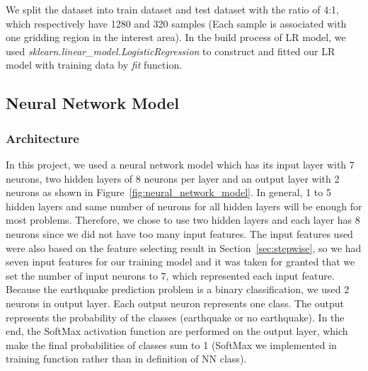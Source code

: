 \documentclass[final-report]{report-template}
\begin{document}
We split the dataset into train dataset and test dataset with the ratio of 4:1, which respectively have 1280 and 320 samples (Each sample is associated with one gridding region in the interest area). In the build process of LR model, we used \textit{sklearn.linear\_model.LogisticRegression} to construct and fitted our LR model with training data by \textit{fit} function.

\subsection{Neural Network Model}
\label{sec:NNM}
\subsubsection{Architecture}
In this project, we used a neural network model which has its input layer with 7 neurons, two hidden layers of 8 neurons per layer and an output layer with 2 neurons as shown in Figure~\ref{fig:neural_network_model}. 
In general, 1 to 5 hidden layers and same number of neurons for all hidden layers will be enough for most problems.
Therefore, we chose to use two hidden layers and each layer has 8 neurons since we did not have too many input features.
The input features used were also based on the feature selecting result in Section~\ref{sec:stepwise}, so we had seven input features for our training model and it was taken for granted that we set the number of input neurons to 7, which represented each input feature.
Because the earthquake prediction problem is a binary classification, we used 2 neurons in output layer. Each output neuron represents one class. The output represents the probability of the classes (earthquake or no earthquake). 
In the end, the SoftMax activation function \citep{dunne1997pairing} are performed on the output layer, which make the final probabilities of classes sum to 1 (SoftMax we implemented in training function rather than in definition of NN class).
\end{document}
